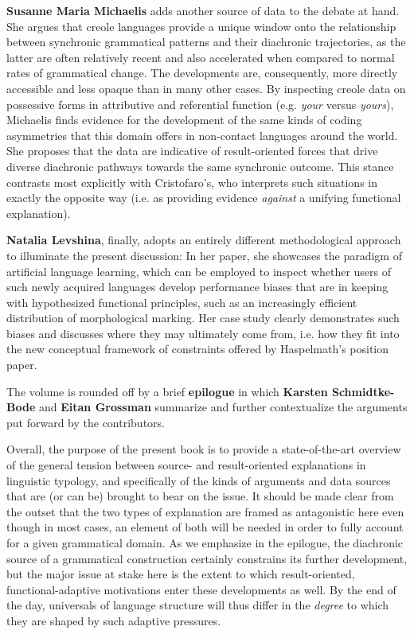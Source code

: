 \documentclass[output=paper]{langsci/langscibook}
\begin{document}
\textbf{Susanne Maria Michaelis} adds another source of data to the debate at hand. She argues that creole languages provide a unique window onto the relationship between synchronic grammatical patterns and their diachronic trajectories, as the latter are often relatively recent and also accelerated when compared to normal rates of grammatical change. The developments are, consequently, more directly accessible and less opaque than in many other cases. By inspecting creole data on possessive forms in attributive and referential function (e.g. \textit{your} versus \textit{yours}), Michaelis finds evidence for the development of the same kinds of coding asymmetries that this domain offers in non-contact languages around the world. She proposes that the data are indicative of result-oriented forces that drive diverse diachronic pathways towards the same synchronic outcome. This stance contrasts most explicitly with Cristofaro’s, who interprets such situations in exactly the opposite way (i.e. as providing evidence \textit{against} a unifying functional explanation).

\textbf{Natalia Levshina}, finally, adopts an entirely different methodological approach to illuminate the present discussion: In her paper, she showcases the paradigm of artificial language learning, which can be employed to inspect whether users of such newly acquired languages develop performance biases that are in keeping with hypothesized functional principles, such as an increasingly efficient distribution of morphological marking. Her case study clearly demonstrates such biases and discusses where they may ultimately come from, i.e. how they fit into the new conceptual framework of constraints offered by Haspelmath’s position paper.

The volume is rounded off by a brief \textbf{epilogue} in which \textbf{Karsten Schmidtke-Bode} and \textbf{Eitan Grossman} summarize and further contextualize the arguments put forward by the contributors. 

Overall, the purpose of the present book is to provide a state-of-the-art overview of the general tension between source- and result-oriented explanations in linguistic typology, and specifically of the kinds of arguments and data sources that are (or can be) brought to bear on the issue. It should be made clear from the outset that the two types of explanation are framed as antagonistic here even though in most cases, an element of both will be needed in order to fully account for a given grammatical domain. As we emphasize in the epilogue, the diachronic source of a grammatical construction certainly constrains its further development, but the major issue at stake here is the extent to which result-oriented, functional-adaptive motivations enter these developments as well. By the end of the day, universals of language structure will thus differ in the \textit{degree} to which they are shaped by such adaptive pressures.
\end{document}
